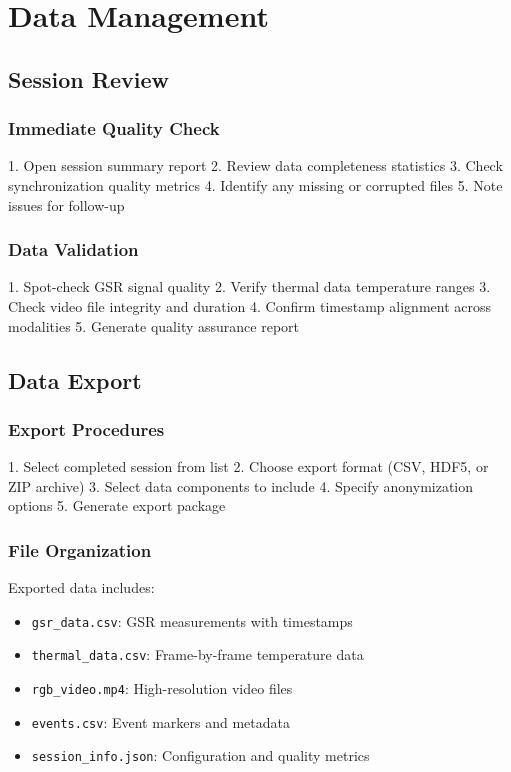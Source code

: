 \section{Data Management}

\subsection{Session Review}

\subsubsection{Immediate Quality Check}

1. Open session summary report
2. Review data completeness statistics
3. Check synchronization quality metrics
4. Identify any missing or corrupted files
5. Note issues for follow-up

\subsubsection{Data Validation}

1. Spot-check GSR signal quality
2. Verify thermal data temperature ranges
3. Check video file integrity and duration
4. Confirm timestamp alignment across modalities
5. Generate quality assurance report

\subsection{Data Export}

\subsubsection{Export Procedures}

1. Select completed session from list
2. Choose export format (CSV, HDF5, or ZIP archive)
3. Select data components to include
4. Specify anonymization options
5. Generate export package

\subsubsection{File Organization}

Exported data includes:
\begin{itemize}
\item \texttt{gsr\_data.csv}: GSR measurements with timestamps
\item \texttt{thermal\_data.csv}: Frame-by-frame temperature data
\item \texttt{rgb\_video.mp4}: High-resolution video files
\item \texttt{events.csv}: Event markers and metadata
\item \texttt{session\_info.json}: Configuration and quality metrics
\end{itemize}

